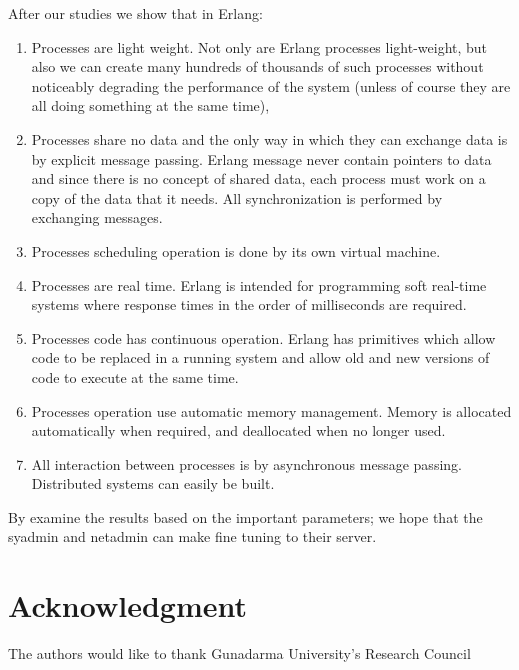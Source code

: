 \documentclass[final,
notitlepage,
narroweqnarray,
    inline,
    twoside,
]{ieee}
\begin{document}
After our studies we show that in Erlang:

\begin{enumerate}
\item Processes are light weight. Not only are Erlang processes
light-weight, but also we can create many hundreds of thousands of
such processes without noticeably degrading the performance of the
system (unless of course they are all doing something at the same
time),

\item  Processes share no data and the only way in which they can
exchange data is by explicit message passing. Erlang message never
contain pointers to data and since there is no concept of shared
data, each process must work on a copy of the data that it needs.
All synchronization is performed by exchanging messages.

\item Processes scheduling operation is done by its own virtual
machine.

\item Processes are real time. Erlang is intended for programming
soft real-time systems where response times in the order of
milliseconds are required.

\item Processes code has continuous operation. Erlang has
primitives which allow code to be replaced in a running system and
allow old and new versions of code to execute at the same time.

\item Processes operation use automatic memory management. Memory
is allocated automatically when required, and deallocated when no
longer used.

\item All interaction between processes is by asynchronous message
passing. Distributed systems can easily be built.
\end{enumerate}

By examine the results based on the important parameters; we hope
that the syadmin and netadmin can make fine tuning to their
server.


\section*{Acknowledgment}
The authors would like to thank Gunadarma University's Research
Council
\end{document}
